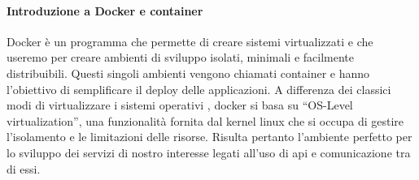\paragraph{Introduzione a Docker e container}
Docker è un programma che permette di creare sistemi virtualizzati e che useremo per creare ambienti di sviluppo isolati, minimali e facilmente distribuibili. Questi singoli ambienti vengono chiamati container e hanno l’obiettivo di  semplificare il deploy delle applicazioni. A differenza dei classici modi di virtualizzare i sistemi operativi , docker si basa su “OS-Level virtualization”, una funzionalità fornita dal kernel linux che si occupa di gestire l’isolamento e le limitazioni delle risorse.
Risulta pertanto l’ambiente perfetto per lo sviluppo dei servizi di nostro interesse legati all’uso di api e comunicazione tra di essi. 

